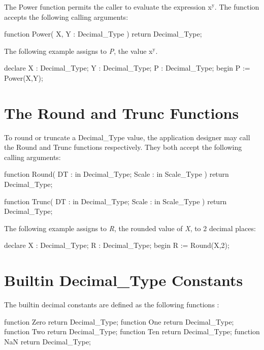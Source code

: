 \documentclass[english,letterpaper]{book}
\begin{document}
The Power function permits the caller to evaluate the expression x$^{\textrm{y}}$.
The function accepts the following calling arguments:

\begin{Code}
function Power(
   X, Y : Decimal_Type
) return Decimal_Type;
\end{Code}

The following example assigns to \emph{P}, the value x$^{\textrm{y}}$.

\begin{Example}
declare
   X : Decimal_Type;
   Y : Decimal_Type;
   P : Decimal_Type;
begin
   P := Power(X,Y);
\end{Example}

\section{The Round and Trunc Functions}

To round or truncate a Decimal\_Type
value, the application designer may call the Round and Trunc functions
respectively. They both accept the following calling arguments:

\begin{Code}
function Round(
   DT :    in Decimal_Type;
   Scale : in Scale_Type
) return Decimal_Type;
\end{Code}

\begin{Code}
function Trunc(
   DT :    in Decimal_Type;
   Scale : in Scale_Type
) return Decimal_Type;
\end{Code}

The following example assigns to \emph{R}, the rounded value of \emph{X},
to 2 decimal places:

\begin{Example}
declare
   X : Decimal_Type;
   R : Decimal_Type;
begin
   R := Round(X,2);
\end{Example}

\section{Builtin Decimal\_Type Constants}

The builtin decimal constants are defined
as the following functions%
:

\begin{Code}

   function Zero return Decimal_Type;
   function One return Decimal_Type;
   function Two return Decimal_Type;
   function Ten return Decimal_Type;
   function NaN return Decimal_Type;

\end{Code}
\end{document}
